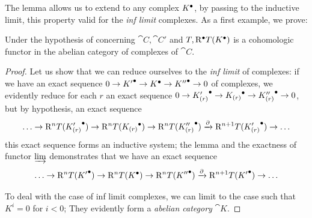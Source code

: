 The lemma  allows us to extend to any complex ${K}^{\bullet}$, by passing to the inductive limit,  
this property valid for the \emph{inf limit} complexes.
As a first example, we prove:

\begin{proposition}[11.5.2]
\label{0.11.5.2}
Under the hypothesis of  concerning $\cat{C}, \cat{C'}$ and $T, {\mathrm{R}}^{\bullet} T({K}^{\bullet})$ 
is a cohomologic functor in the abelian category of complexes of $\cat{C}$.
\end{proposition}

\begin{proof}
Let us show that we can reduce ourselves to the \emph{inf limit} of complexes: 
if we have an exact sequence $0 \rightarrow {K'}^{\bullet} \rightarrow {K}^{\bullet} \rightarrow {K''}^{\bullet} \rightarrow 0$ of complexes, 
we evidently reduce for each $r$ an exact sequence $0 \rightarrow {K'_{(r)}}^{\bullet} \rightarrow {K_{(r)}}^{\bullet} \rightarrow {K''_{(r)}}^{\bullet} \rightarrow 0$, 
but by hypothesis, an exact sequence
\[
  \ldots \rightarrow \mathrm{R}^n T({K'_{(r)}}^{\bullet}) \rightarrow \mathrm{R}^n T({K_{(r)}}^{\bullet}) \rightarrow \mathrm{R}^n T({K''_{(r)}}^{\bullet}) \xrightarrow[]{\partial} \mathrm{R}^{n+1} T({K'_{(r)}}^{\bullet}) \rightarrow \ldots
\]
this exact sequence forms an inductive system; the lemma  and the exactness of functor $\varinjlim$ demonstrates that we have an exact sequence
\[
  \ldots \rightarrow \mathrm{R}^n T({K'}^{\bullet}) \rightarrow \mathrm{R}^n T({K}^{\bullet}) \rightarrow \mathrm{R}^n T({K''}^{\bullet}) \xrightarrow[]{\partial} \mathrm{R}^{n+1} T({K'}^{\bullet}) \rightarrow \ldots
\]

To deal with the case of inf limit complexes, we can limit to the case such that $K^i=0$ for $i<0$;
They evidently form a \emph{abelian category} $\cat{K}$.
\end{proof}

